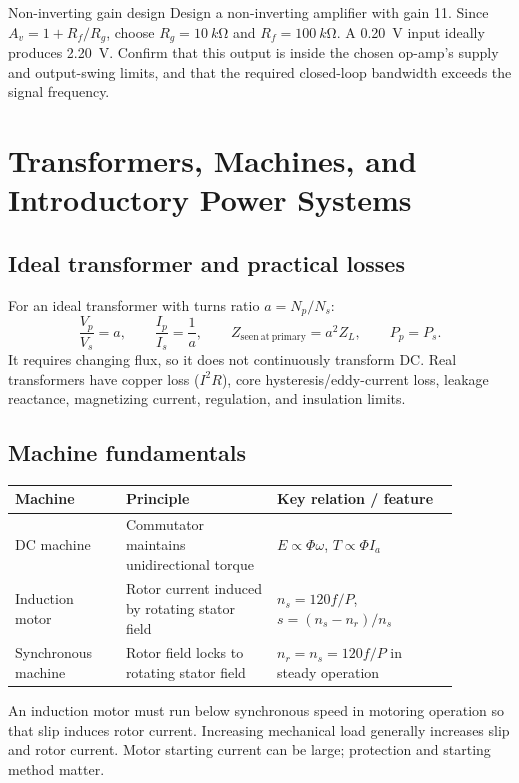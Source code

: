 \documentclass[10pt]{article}
\begin{document}
\begin{examplebox}{Non-inverting gain design}
Design a non-inverting amplifier with gain 11. Since $A_v=1+R_f/R_g$, choose
$R_g=\SI{10}{k\ohm}$ and $R_f=\SI{100}{k\ohm}$. A \SI{0.20}{V} input ideally
produces \SI{2.20}{V}. Confirm that this output is inside the chosen op-amp's
supply and output-swing limits, and that the required closed-loop bandwidth
exceeds the signal frequency.
\end{examplebox}

\section{Transformers, Machines, and Introductory Power Systems}

\subsection{Ideal transformer and practical losses}
For an ideal transformer with turns ratio $a=N_p/N_s$:
\begin{equation}
 \frac{V_p}{V_s}=a,\qquad \frac{I_p}{I_s}=\frac1a,\qquad
 Z_{\mathrm{seen\ at\ primary}}=a^2Z_L,\qquad P_p=P_s.
\end{equation}
It requires changing flux, so it does not continuously transform DC. Real
transformers have copper loss ($I^2R$), core hysteresis/eddy-current loss,
leakage reactance, magnetizing current, regulation, and insulation limits.

\subsection{Machine fundamentals}
\begin{center}
\small
\begin{tabular}{p{0.22\linewidth}p{0.3\linewidth}p{0.36\linewidth}}
\toprule
Machine & Principle & Key relation / feature \\
\midrule
DC machine & Commutator maintains unidirectional torque & $E\propto\Phi\omega$, $T\propto\Phi I_a$ \\
Induction motor & Rotor current induced by rotating stator field & $n_s=120f/P$, $s=(n_s-n_r)/n_s$ \\
Synchronous machine & Rotor field locks to rotating stator field & $n_r=n_s=120f/P$ in steady operation \\
\bottomrule
\end{tabular}
\end{center}
An induction motor must run below synchronous speed in motoring operation so
that slip induces rotor current. Increasing mechanical load generally increases
slip and rotor current. Motor starting current can be large; protection and
starting method matter.
\end{document}
